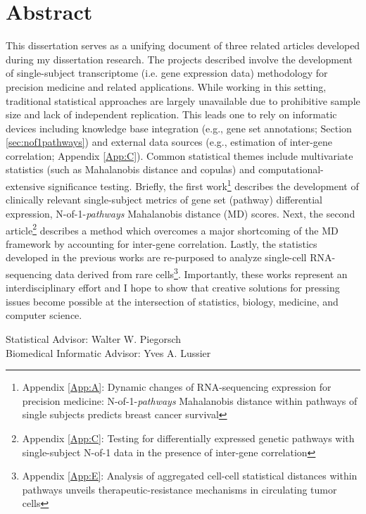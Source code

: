 \documentclass[final]{ua-thesis}
\numberwithin{equation}{section}
\begin{document}
\chapter*{Abstract}
\noindent This dissertation serves as a unifying document of three related articles developed during my dissertation research. The projects described involve the development of single-subject transcriptome (i.e. gene expression data) methodology for precision medicine and related applications. While working in this setting, traditional statistical approaches are largely unavailable due to prohibitive sample size and lack of independent replication. This leads one to rely on informatic devices including knowledge base integration (e.g., gene set annotations; Section \ref{sec:nof1pathways}) and external data sources (e.g., estimation of inter-gene correlation; Appendix \ref{App:C}). Common statistical themes include multivariate statistics (such as Mahalanobis distance and copulas) and computational-extensive significance testing. Briefly, the first work\footnote{Appendix \ref{App:A}: Dynamic changes of RNA-sequencing expression for precision medicine: N-of-1-\emph{pathways} Mahalanobis distance within pathways of single subjects predicts breast cancer survival} describes the development of clinically relevant single-subject metrics of gene set (pathway) differential expression, N-of-1-\emph{pathways} Mahalanobis distance (MD) scores. Next, the second article\footnote{Appendix \ref{App:C}: Testing for differentially expressed genetic pathways with single-subject N-of-1 data in the presence of inter-gene correlation} describes a method which overcomes a major shortcoming of the MD framework by accounting for inter-gene correlation. Lastly, the statistics developed in the previous works are re-purposed to analyze single-cell RNA-sequencing data derived from rare cells\footnote{Appendix \ref{App:E}: Analysis of aggregated cell-cell statistical distances within pathways unveils therapeutic-resistance mechanisms in circulating tumor cells}. Importantly, these works represent an interdisciplinary effort and I hope to show that creative solutions for pressing issues become possible at the intersection of statistics, biology, medicine, and computer science.

\vspace{1pc}

\noindent Statistical Advisor: Walter W. Piegorsch\\
Biomedical Informatic Advisor: Yves A. Lussier






\end{document}

